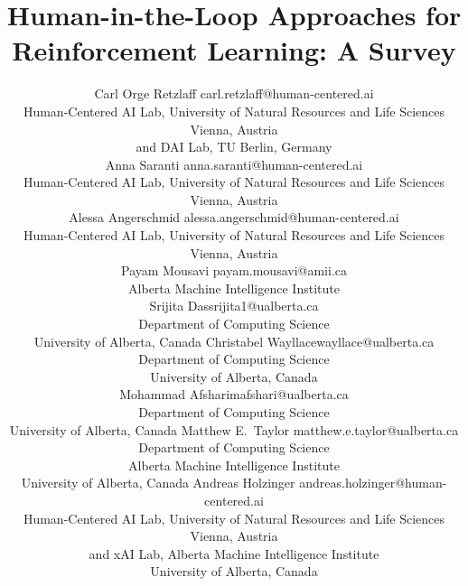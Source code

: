 \documentclass[twoside,11pt]{article}
\begin{document}
\title{Human-in-the-Loop Approaches for Reinforcement Learning: A Survey}

\author{\name Carl Orge Retzlaff \email carl.retzlaff@human-centered.ai\\ 
\addr Human-Centered AI Lab, University of Natural Resources and Life Sciences Vienna, Austria\\
and DAI Lab, TU Berlin, Germany\\
\AND
\name Anna Saranti \email anna.saranti@human-centered.ai \\
\addr Human-Centered AI Lab, University of Natural Resources and Life Sciences Vienna, Austria\\
\AND
\name Alessa Angerschmid \email alessa.angerschmid@human-centered.ai \\
\addr Human-Centered AI Lab, University of Natural Resources and Life Sciences Vienna, Austria\\
\AND
\name Payam Mousavi \email payam.mousavi@amii.ca \\
\addr Alberta Machine Intelligence Institute\\
\AND
\name Srijita Das\email srijita1@ualberta.ca \\
\addr Department of Computing Science \\ 
University of Alberta, Canada
\AND
\name Christabel Wayllace\email wayllace@ualberta.ca \\
\addr Department of Computing Science \\ University of Alberta, Canada\\
\AND
\name Mohammad Afshari\email mafshari@ualberta.ca \\
\addr Department of Computing Science \\ University of Alberta, Canada
\AND
\name Matthew E.~Taylor \email matthew.e.taylor@ualberta.ca \\
\addr Department of Computing Science\\
Alberta Machine Intelligence Institute\\
University of Alberta, Canada
\AND
\name Andreas Holzinger \email andreas.holzinger@human-centered.ai \\
\addr Human-Centered AI Lab, University of Natural Resources and Life Sciences Vienna, Austria \\
and xAI Lab, Alberta Machine Intelligence Institute\\
University of Alberta, Canada
}



\maketitle
\end{document}
